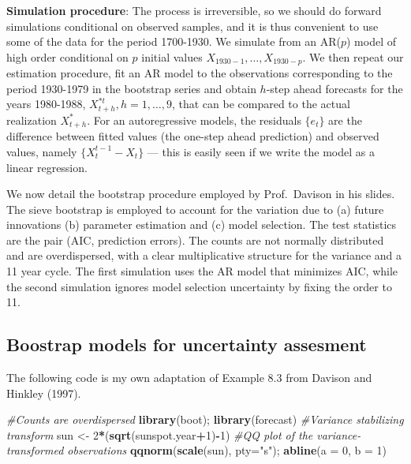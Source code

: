 \documentclass[]{book}
\newenvironment{Shaded}{\begin{snugshade}}{\end{snugshade}}
\newcommand{\KeywordTok}[1]{\textcolor[rgb]{0.13,0.29,0.53}{\textbf{#1}}}
\newcommand{\DataTypeTok}[1]{\textcolor[rgb]{0.13,0.29,0.53}{#1}}
\newcommand{\DecValTok}[1]{\textcolor[rgb]{0.00,0.00,0.81}{#1}}
\newcommand{\StringTok}[1]{\textcolor[rgb]{0.31,0.60,0.02}{#1}}
\newcommand{\CommentTok}[1]{\textcolor[rgb]{0.56,0.35,0.01}{\textit{#1}}}
\newcommand{\OperatorTok}[1]{\textcolor[rgb]{0.81,0.36,0.00}{\textbf{#1}}}
\newcommand{\NormalTok}[1]{#1}
\begin{document}
\textbf{Simulation procedure}: The process is irreversible, so we should
do forward simulations conditional on observed samples, and it is thus
convenient to use some of the data for the period 1700-1930. We simulate
from an AR(\(p\)) model of high order conditional on \(p\) initial
values \(X_{1930-1}, \ldots, X_{1930-p}\). We then repeat our estimation
procedure, fit an AR model to the observations corresponding to the
period 1930-1979 in the bootstrap series and obtain \(h\)-step ahead
forecasts for the years 1980-1988, \(X_{t+h}^{*t}, h=1, \ldots, 9\),
that can be compared to the actual realization \(X^{*}_{t+h}\). For an
autoregressive models, the residuals \(\{e_{t}\}\) are the difference
between fitted values (the one-step ahead prediction) and observed
values, namely \(\{X_{t}^{t-1}-X_{t}\}\) --- this is easily seen if we
write the model as a linear regression.

We now detail the bootstrap procedure employed by Prof.~Davison in his
slides. The sieve bootstrap is employed to account for the variation due
to (a) future innovations (b) parameter estimation and (c) model
selection. The test statistics are the pair (AIC, prediction errors).
The counts are not normally distributed and are overdispersed, with a
clear multiplicative structure for the variance and a 11 year cycle. The
first simulation uses the AR model that minimizes AIC, while the second
simulation ignores model selection uncertainty by fixing the order to
11.

\subsection{Boostrap models for uncertainty
assesment}\label{boostrap-models-for-uncertainty-assesment}

The following code is my own adaptation of Example 8.3 from Davison and
Hinkley (1997).

\begin{Shaded}
\begin{Highlighting}[]
\CommentTok{#Counts are overdispersed}
\KeywordTok{library}\NormalTok{(boot); }\KeywordTok{library}\NormalTok{(forecast)}
\CommentTok{#Variance stabilizing transform}
\NormalTok{sun <-}\StringTok{ }\DecValTok{2}\OperatorTok{*}\NormalTok{(}\KeywordTok{sqrt}\NormalTok{(sunspot.year}\OperatorTok{+}\DecValTok{1}\NormalTok{)}\OperatorTok{-}\DecValTok{1}\NormalTok{)}
\CommentTok{#QQ plot of the variance-transformed observations}
\KeywordTok{qqnorm}\NormalTok{(}\KeywordTok{scale}\NormalTok{(sun), }\DataTypeTok{pty=}\StringTok{"s"}\NormalTok{); }\KeywordTok{abline}\NormalTok{(}\DataTypeTok{a =} \DecValTok{0}\NormalTok{, }\DataTypeTok{b =} \DecValTok{1}\NormalTok{)}
\end{Highlighting}
\end{Shaded}
\end{document}
